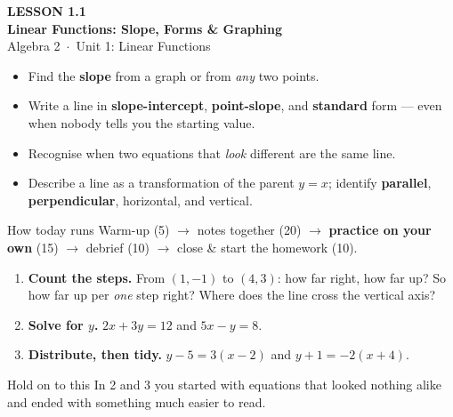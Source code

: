 \documentclass[aspectratio=169, 11pt]{beamer}
\begin{document}
{
\begin{frame}[plain]
  \vspace{2.8cm}\hspace{0.55cm}%
  \begin{minipage}{0.9\textwidth}
    {\color{goldacc}\bfseries\small LESSON 1.1}\\[0.5cm]
    {\color{white}\bfseries\LARGE Linear Functions: Slope, Forms \& Graphing}\\[1.2cm]
    {\color{forestmid}\small Algebra 2~$\cdot$~Unit 1: Linear Functions}
  \end{minipage}
\end{frame}
}

\begin{frame}[t, plain]
  \begin{itemize}\setlength{\itemsep}{6pt}
    \item Find the \textbf{slope} from a graph or from \emph{any} two points.
    \item Write a line in \textbf{slope-intercept}, \textbf{point-slope}, and \textbf{standard}
          form --- even when nobody tells you the starting value.
    \item Recognise when two equations that \emph{look} different are the same line.
    \item Describe a line as a transformation of the parent $y=x$; identify \textbf{parallel},
          \textbf{perpendicular}, horizontal, and vertical.
  \end{itemize}
  \vspace{4pt}
  \begin{block}{How today runs}
    Warm-up (5) $\to$ notes together (20) $\to$ \textbf{practice on your own} (15) $\to$ debrief
    (10) $\to$ close \& start the homework (10).
  \end{block}
\end{frame}

\begin{frame}[t, plain]
  \begin{enumerate}\setlength{\itemsep}{7pt}
    \item \textbf{Count the steps.} From $(1,-1)$ to $(4,3)$: how far right, how far up? So how far
          up per \emph{one} step right? Where does the line cross the vertical axis?
    \item \textbf{Solve for $y$.} \; $2x+3y=12$ \quad and \quad $5x-y=8$.
    \item \textbf{Distribute, then tidy.} \; $y-5=3(x-2)$ \quad and \quad $y+1=-2(x+4)$.
  \end{enumerate}
  \vspace{6pt}
  \begin{block}{Hold on to this}
    In 2 and 3 you started with equations that looked nothing alike and ended with something much
    easier to read.
  \end{block}
\end{frame}
\end{document}
